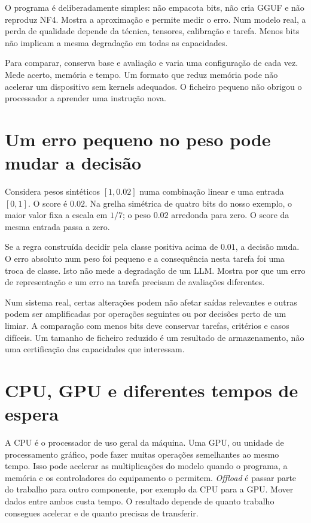 O programa é deliberadamente simples: não empacota bits, não cria GGUF e não reproduz NF4. Mostra a aproximação e permite medir o erro. Num modelo real, a perda de qualidade depende da técnica, tensores, calibração e tarefa. Menos bits não implicam a mesma degradação em todas as capacidades.

Para comparar, conserva base e avaliação e varia uma configuração de cada vez. Mede acerto, memória e tempo. Um formato que reduz memória pode não acelerar um dispositivo sem kernels adequados. O ficheiro pequeno não obrigou o processador a aprender uma instrução nova.

\section{Um erro pequeno no peso pode mudar a decisão}
Considera pesos sintéticos $[1,0.02]$ numa combinação linear e uma entrada $[0,1]$. O score é $0.02$. Na grelha simétrica de quatro bits do nosso exemplo, o maior valor fixa a escala em $1/7$; o peso $0.02$ arredonda para zero. O score da mesma entrada passa a zero.

Se a regra construída decidir pela classe positiva acima de $0.01$, a decisão muda. O erro absoluto num peso foi pequeno e a consequência nesta tarefa foi uma troca de classe. Isto não mede a degradação de um LLM. Mostra por que um erro de representação e um erro na tarefa precisam de avaliações diferentes.

Num sistema real, certas alterações podem não afetar saídas relevantes e outras podem ser amplificadas por operações seguintes ou por decisões perto de um limiar. A comparação com menos bits deve conservar tarefas, critérios e casos difíceis. Um tamanho de ficheiro reduzido é um resultado de armazenamento, não uma certificação das capacidades que interessam.

\section{CPU, GPU e diferentes tempos de espera}
A CPU é o processador de uso geral da máquina. Uma GPU, ou unidade de processamento gráfico, pode fazer muitas operações semelhantes ao mesmo tempo. Isso pode acelerar as multiplicações do modelo quando o programa, a memória e os controladores do equipamento o permitem. \emph{Offload} é passar parte do trabalho para outro componente, por exemplo da CPU para a GPU. Mover dados entre ambos custa tempo. O resultado depende de quanto trabalho consegues acelerar e de quanto precisas de transferir.

